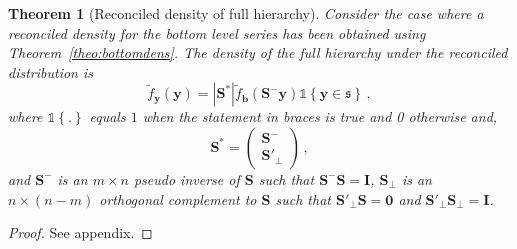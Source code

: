 \documentclass[12pt]{article}
\newtheorem{theo}{Theorem}[section]
\theoremstyle{definition}
\begin{document}
\begin{theo}[Reconciled density of full hierarchy]\label{theo:fulldens}
	Consider the case where a reconciled density for the bottom level series has been obtained using Theorem~\ref{theo:bottomdens}.  The density of the full hierarchy under the reconciled distribution is
	\[
	\tilde{f}_{\bm{y}}(\bm{y})=|\bm{S^*}|\tilde{f}_{\bm b}({\bm{S^-}\bm{y}})\mathbb{1}\left\{\bm{y}\in\mathfrak{s}\right\}\,,
	\]
	where $\mathbb{1}\left\{.\right\}$ equals $1$ when the statement in braces is true and 0 otherwise and,
	\[\bm{S^*}=\begin{pmatrix}\bm{S}^-\\\bm{S}'_\perp\end{pmatrix}\,,\]
	and $\bm{S^-}$ is an $m\times n$ pseudo inverse of $\bm{S}$ such that $\bm{S}^-\bm{S}=\bm{I}$, $\bm{S_\perp}$ is an $n\times (n-m)$ orthogonal complement to $\bm{S}$ such that $\bm{S}'_\perp\bm{S}=\bm{0}$ and $\bm{S}'_\perp\bm{S}_\perp=\bm{I}$. 
\end{theo}

\begin{proof}
	See appendix.
\end{proof}



\end{document}
